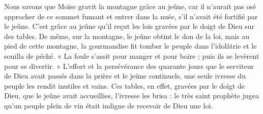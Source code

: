  Nous savons que Moïse gravit la montagne grâce au jeûne, car il n’aurait pas osé approcher de ce sommet fumant et entrer dans la nuée, s’il n’avait été fortifié par le jeûne. C’est grâce au jeûne qu’il reçut les lois gravées par le doigt de Dieu sur des tables. De même, sur la montagne, le jeûne obtint le don de la loi, mais au pied de cette montagne, la gourmandise fit tomber le peuple dans l’idolâtrie et le souilla de péché. « La foule s’assit pour manger et pour boire ; puis ils se levèrent pour se divertir. » L’effort et la persévérance des quarante jours que le serviteur de Dieu avait passés dans la prière et le jeûne continuels, une seule ivresse du peuple les rendit inutiles et vains. Ces tables, en effet, gravées par le doigt de Dieu, que le jeûne avait accueillies, l’ivresse les brisa : le très saint prophète jugea qu’un peuple plein de vin était indigne de recevoir de Dieu une loi.